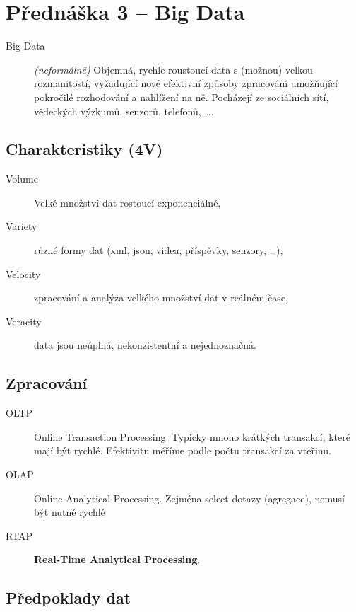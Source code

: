 \section{Přednáška 3 -- Big Data}

\begin{description}
    \item[Big Data] \textit{(neformálně)} Objemná, rychle roustoucí data s (možnou) velkou rozmanitostí, vyžadující nové efektivní způsoby zpracování umožňující pokročilé rozhodování a nahlížení na ně.
    Pocházejí ze sociálních sítí, vědeckých výzkumů, senzorů, telefonů, \dots.
\end{description}

\subsection*{Charakteristiky (4V)}

\begin{description}
    \item[Volume] Velké množství dat rostoucí exponenciálně,
    \item[Variety] různé formy dat (xml, json, videa, příspěvky, senzory, \dots),
    \item[Velocity] zpracování a analýza velkého množství dat v reálném čase,
    \item[Veracity] data jsou neúplná, nekonzistentní a nejednoznačná.
\end{description}

\subsection*{Zpracování}

\begin{description}
    \item[OLTP] Online Transaction Processing. Typicky mnoho krátkých transakcí, které mají být rychlé. Efektivitu měříme podle počtu transakcí za vteřinu.
    \item[OLAP] Online Analytical Processing. Zejména select dotazy (agregace), nemusí být nutně rychlé
    \item[RTAP] \textbf{Real-Time Analytical Processing}.
\end{description}

\subsection*{Předpoklady dat}

